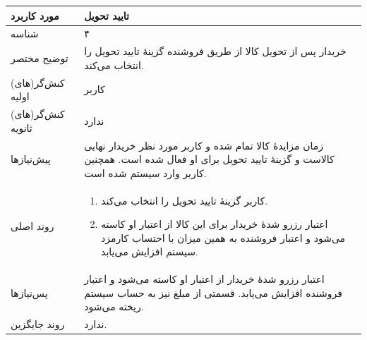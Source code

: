 \documentclass{article}
\begin{document}
\begin{center}
\bgroup
\def\arraystretch{1.5}
\begin{tabular} {|p{}|p{}|}
\hline
 مورد کاربرد & 
 تایید تحویل
\\ \hline
 شناسه &
۴
\\ \hline
توضیح مختصر &
خریدار پس از تحویل کالا از طریق فروشنده گزینهٔ تایید تحویل  را انتخاب می‌کند.
\\ \hline
کنش‌گر(های) اولیه &
کاربر
\\ \hline
کنش‌گر(های) ثانویه &
ندارد
\\ \hline
پیش‌نیازها &
زمان مزایدهٔ کالا تمام شده و کاربر مورد نظر خریدار نهایی کالاست و گزینهٔ تایید تحویل برای او فعال شده است. همچنین کاربر وارد سیستم شده است.
\\ \hline
روند اصلی &
\begin{enumerate}[nosep,topsep=0cm]
\item
کاربر گزینهٔ تایید تحویل را انتخاب می‌کند.
\item
اعتبار رزرو شدهٔ خریدار برای این کالا از اعتبار او کاسته می‌شود و اعتبار فروشنده به همین میزان با احتساب کارمزد سیستم افزایش می‌یابد.
\end{enumerate}
\\ \hline
پس‌نیازها &
اعتبار رزرو شدهٔ خریدار از اعتبار او کاسته می‌شود و اعتبار فروشنده افزایش می‌یابد. قسمتی از مبلغ نیز به حساب سیستم ریخته می‌شود.
\\ \hline
روند جایگزین &
ندارد.
\\ \hline
\end{tabular}
\egroup
\end{center}

\newpage
\end{document}
